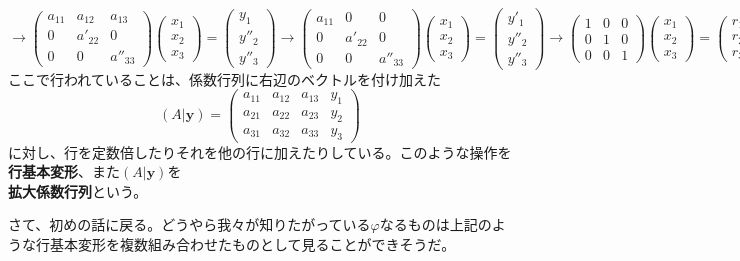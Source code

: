 \documentclass[dvipdfmx]{jsarticle}
\begin{document}
\[\to\begin{pmatrix}a_{11}&a_{12}&a_{13}\\0&a'_{22}&0\\0&0&a''_{33}\end{pmatrix}\begin{pmatrix}x_1\\x_2\\x_3\end{pmatrix}=\begin{pmatrix}y_1\\y''_2\\y''_3\end{pmatrix}\to\begin{pmatrix}a_{11}&0&0\\0&a'_{22}&0\\0&0&a''_{33}\end{pmatrix}\begin{pmatrix}x_1\\x_2\\x_3\end{pmatrix}=\begin{pmatrix}y'_1\\y''_2\\y''_3\end{pmatrix}\to\begin{pmatrix}1&0&0\\0&1&0\\0&0&1\end{pmatrix}\begin{pmatrix}x_1\\x_2\\x_3\end{pmatrix}=\begin{pmatrix}r_1\\r_2\\r_3\end{pmatrix}\]
ここで行われていることは、係数行列に右辺のベクトルを付け加えた
\[(A|\bm{y})=\begin{pmatrix}a_{11}&a_{12}&a_{13}&y_1\\a_{21}&a_{22}&a_{23}&y_2\\a_{31}&a_{32}&a_{33}&y_3\end{pmatrix}\]
に対し、行を定数倍したりそれを他の行に加えたりしている。このような操作を\textbf{行基本変形}、また$(A|\bm{y})$を\\\textbf{拡大係数行列}という。\par
さて、初めの話に戻る。どうやら我々が知りたがっている$\varphi$なるものは上記のような行基本変形を複数組み合わせたものとして見ることができそうだ。\\\par
\end{document}
